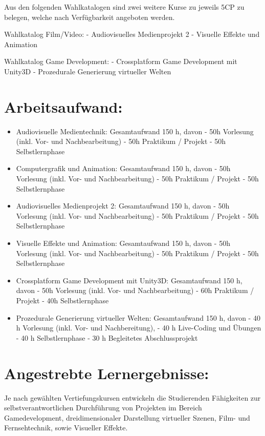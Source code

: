 Aus den folgenden Wahlkatalogen sind zwei weitere Kurse zu jeweils 5CP
zu belegen, welche nach Verfügbarkeit angeboten werden.

Wahlkatalog Film/Video: - Audiovisuelles Medienprojekt 2 - Visuelle
Effekte und Animation

Wahlkatalog Game Development: - Crossplatform Game Development mit
Unity3D - Prozedurale Generierung virtueller Welten

\section{Arbeitsaufwand:}\label{arbeitsaufwand-28}

\begin{itemize}
\tightlist
\item
  Audiovisuelle Medientechnik: Gesamtaufwand 150 h, davon - 50h
  Vorlesung (inkl. Vor- und Nachbearbeitung) - 50h Praktikum / Projekt -
  50h Selbstlernphase
\item
  Computergrafik und Animation: Gesamtaufwand 150 h, davon - 50h
  Vorlesung (inkl. Vor- und Nachbearbeitung) - 50h Praktikum / Projekt -
  50h Selbstlernphase
\item
  Audiovisuelles Medienprojekt 2: Gesamtaufwand 150 h, davon - 50h
  Vorlesung (inkl. Vor- und Nachbearbeitung) - 50h Praktikum / Projekt -
  50h Selbstlernphase
\item
  Visuelle Effekte und Animation: Gesamtaufwand 150 h, davon - 50h
  Vorlesung (inkl. Vor- und Nachbearbeitung) - 50h Praktikum / Projekt -
  50h Selbstlernphase
\item
  Crossplatform Game Development mit Unity3D: Gesamtaufwand 150 h, davon
  - 50h Vorlesung (inkl. Vor- und Nachbearbeitung) - 60h Praktikum /
  Projekt - 40h Selbstlernphase
\item
  Prozedurale Generierung virtueller Welten: Gesamtaufwand 150 h, davon
  - 40 h Vorlesung (inkl. Vor- und Nachbereitung), - 40 h Live-Coding
  und Übungen - 40 h Selbstlernphase - 30 h Begleitetes Abschlussprojekt
\end{itemize}

\section{Angestrebte
Lernergebnisse:}\label{angestrebte-lernergebnisse-29}

Je nach gewählten Vertiefungskursen entwickeln die Studierenden
Fähigkeiten zur selbstverantwortlichen Durchführung von Projekten im
Bereich Gamedevelopment, dreidimensionaler Darstellung virtueller
Szenen, Film- und Fernsehtechnik, sowie Visueller Effekte.

